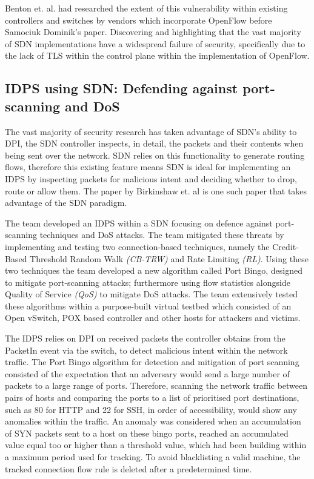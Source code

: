 \documentclass[12pt, oneside]{book}
\begin{document}
Benton et. al.\cite{benton2013openflow} had researched the extent of this vulnerability within
existing controllers and switches by vendors which incorporate OpenFlow before Samociuk Dominik's paper.
Discovering and highlighting
that the vast majority of SDN implementations have a widespread failure of security, specifically due to the lack of TLS
within the control plane within the implementation of OpenFlow. 


\subsection{IDPS using SDN: Defending against port-scanning and DoS}
The vast majority of security research has taken advantage of SDN's ability to DPI,
the SDN controller inspects, in detail, the packets and their contents when being sent over the network. SDN relies on this functionality to generate
routing flows, therefore this existing feature means SDN is ideal for implementing
an IDPS by inspecting packets for malicious intent and deciding whether to drop, route or allow them. 
The paper by Birkinshaw et. al \cite{birkinshaw2019implementing}is one such paper that takes advantage of the SDN paradigm.

The team developed an IDPS within a SDN focusing on defence against port-scanning techniques and DoS attacks.
The team mitigated these threats by implementing and testing two connection-based techniques, namely the Credit-Based Threshold Random
Walk \emph{(CB-TRW)} and Rate Limiting \emph{(RL)}. Using these two techniques the team developed a new algorithm called Port Bingo,
designed to mitigate port-scanning attacks; furthermore using flow statistics 
alongside Quality of Service \emph{(QoS)} to mitigate DoS attacks. The team extensively tested these algorithms within a
purpose-built virtual testbed which consisted of an Open vSwitch, POX based controller and other hosts for
attackers and victims. \newline

The IDPS relies on DPI on received packets the controller obtains from the PacketIn event via the switch, to detect malicious intent
within the network traffic. The Port Bingo algorithm for detection and mitigation of port scanning consisted of the expectation that an adversary would send a large
number of packets to a large range of ports. Therefore, scanning the network traffic between pairs of hosts and comparing the ports to a list of prioritised port destinations, such as
80 for HTTP and 22 for SSH, in order of accessibility, would show any anomalies within the traffic.
An anomaly was considered when an accumulation of SYN packets sent to a host on these bingo ports, reached an accumulated value equal too or
higher than a threshold value, which had been building within a maximum period used for tracking. To avoid blacklisting a valid
machine, the tracked connection flow rule is deleted after a predetermined time.
\end{document}
